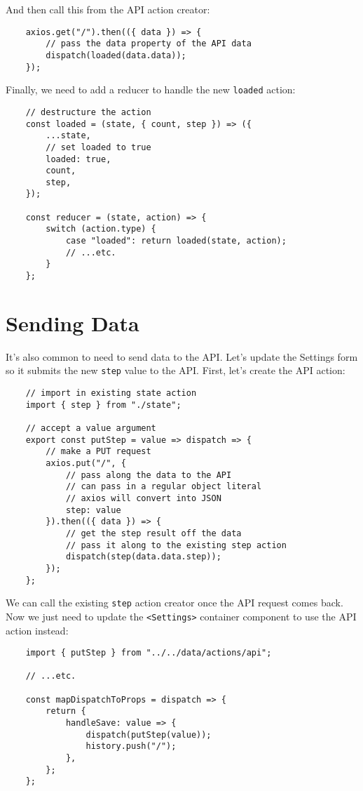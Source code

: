 And then call this from the API action creator:

\begin{verbatim}
    axios.get("/").then(({ data }) => {
        // pass the data property of the API data
        dispatch(loaded(data.data));
    });
\end{verbatim}

Finally, we need to add a reducer to handle the new \texttt{loaded} action:

\begin{verbatim}
    // destructure the action
    const loaded = (state, { count, step }) => ({
        ...state,
        // set loaded to true
        loaded: true,
        count,
        step,
    });

    const reducer = (state, action) => {
        switch (action.type) {
            case "loaded": return loaded(state, action);
            // ...etc.
        }
    };
\end{verbatim}


\section{Sending Data}

It's also common to need to send data to the API. Let's update the Settings form so it submits the new \texttt{step} value to the API. First, let's create the API action:

\begin{verbatim}
    // import in existing state action
    import { step } from "./state";

    // accept a value argument
    export const putStep = value => dispatch => {
        // make a PUT request
        axios.put("/", {
            // pass along the data to the API
            // can pass in a regular object literal
            // axios will convert into JSON
            step: value
        }).then(({ data }) => {
            // get the step result off the data
            // pass it along to the existing step action
            dispatch(step(data.data.step));
        });
    };
\end{verbatim}

We can call the existing \texttt{step} action creator once the API request comes back.
\\

Now we just need to update the \texttt{<Settings>} container component to use the API action instead:

\begin{verbatim}
    import { putStep } from "../../data/actions/api";

    // ...etc.

    const mapDispatchToProps = dispatch => {
        return {
            handleSave: value => {
                dispatch(putStep(value));
                history.push("/");
            },
        };
    };
\end{verbatim}


